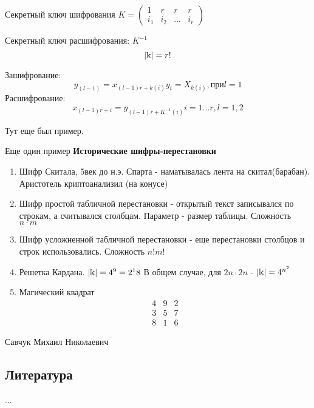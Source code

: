Секретный ключ шифрования $ K = \left( \begin{array}{cccc}
1 & r & r & r \\ 
i_1 & i_2 & ... & i_r
\end{array} \right) $

Секретный ключ расшифрования: $ K^{-1} $
\begin{equation}
	|\Bbbk | = r!
\end{equation}

Зашифрование:
\begin{equation}
y_{(l-1)} = x_{(l-1)r+k(i)}
y_i = X_{k(i)}, при l=1
\end{equation}
Расшифрование:
\begin{equation}
	x_{(l-1)r+i} = y_{(l-1)r + K^{-1}(i)} i=1...r, l=1,2
\end{equation}

Тут еще был пример.

Еще один пример \textbf{Исторические шифры-перестановки}
\begin{enumerate}
	\item Шифр Скитала, 5век до н.э. Спарта - наматывалась лента на скитал(барабан). Аристотель криптоанализил (на конусе)
	\item Шифр простой табличной перестановки - открытый текст записывался по строкам, а считывался столбцам. Параметр - размер таблицы. Сложность $ n\cdot m $
	\item Шифр усложненной табличной перестановки - еще перестановки столбцов и строк использовались. Сложность $ n!m! $
	\item Решетка Кардана. $ |\Bbbk| = 4^9 = 2^18$ В общем случае, для $ 2n\cdot 2n $ - $ |\Bbbk| = 4^{n^2} $
	\item Магический квадрат
	\begin{equation}
		\begin{array}{ccc}
		4 & 9 & 2 \\ 
		3 & 5 & 7 \\ 
		8 & 1 & 6
		\end{array} 
	\end{equation}
\end{enumerate}
Савчук Михаил Николаевич
\subsection{Литература}
...